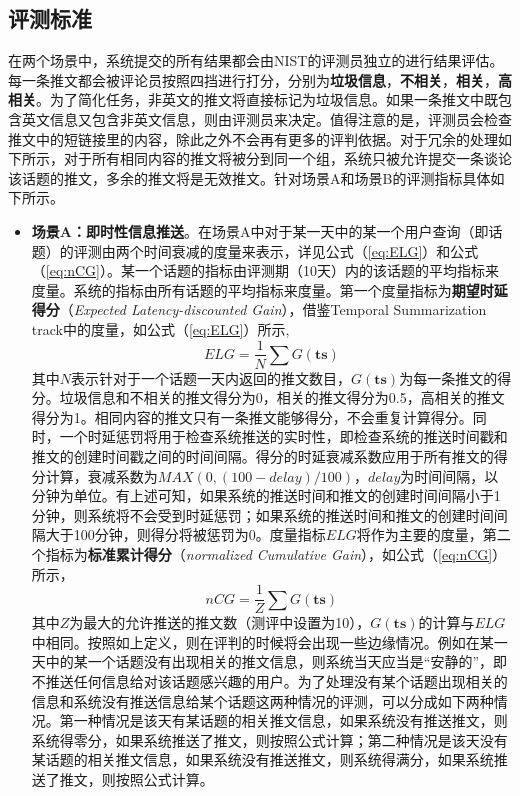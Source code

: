 \subsection{评测标准}
\label{subsec2:evalMetrics}
在两个场景中，系统提交的所有结果都会由NIST的评测员独立的进行结果评估。每一条推文都会被评论员按照四挡进行打分，分别为\textbf{垃圾信息}，\textbf{不相关}，\textbf{相关}，\textbf{高相关}。为了简化任务，非英文的推文将直接标记为垃圾信息。如果一条推文中既包含英文信息又包含非英文信息，则由评测员来决定。值得注意的是，评测员会检查推文中的短链接里的内容，除此之外不会再有更多的评判依据。对于冗余的处理如下所示，对于所有相同内容的推文将被分到同一个组，系统只被允许提交一条谈论该话题的推文，多余的推文将是无效推文。针对场景A和场景B的评测指标具体如下所示。
\begin{itemize}
  \item \textbf{场景A：即时性信息推送}。在场景A中对于某一天中的某一个用户查询（即话题）的评测由两个时间衰减的度量来表示，详见公式（\ref{eq:ELG}）和公式（\ref{eq:nCG}）。某一个话题的指标由评测期（10天）内的该话题的平均指标来度量。系统的指标由所有话题的平均指标来度量。第一个度量指标为\textbf{期望时延得分}（\textit{Expected Latency-discounted Gain}），借鉴Temporal Summarization track中的度量，如公式（\ref{eq:ELG}）所示,
  \begin{equation}
  \label{eq:ELG}
    ELG = \frac{1}{N}\sum {G\left( {\mathbf{ts}} \right)}
  \end{equation}
  其中$N$表示针对于一个话题一天内返回的推文数目，$G\left( {\mathbf{ts}} \right)$为每一条推文的得分。垃圾信息和不相关的推文得分为0，相关的推文得分为0.5，高相关的推文得分为1。相同内容的推文只有一条推文能够得分，不会重复计算得分。同时，一个时延惩罚将用于检查系统推送的实时性，即检查系统的推送时间戳和推文的创建时间戳之间的时间间隔。得分的时延衰减系数应用于所有推文的得分计算，衰减系数为$MAX\left( {0,\left( {100 - delay} \right)/100} \right)$，$delay$为时间间隔，以分钟为单位。有上述可知，如果系统的推送时间和推文的创建时间间隔小于1分钟，则系统将不会受到时延惩罚；如果系统的推送时间和推文的创建时间间隔大于100分钟，则得分将被惩罚为0。度量指标$ELG$将作为主要的度量，第二个指标为\textbf{标准累计得分}（\textit{normalized Cumulative Gain}），如公式（\ref{eq:nCG}）所示，
  \begin{equation}
  \label{eq:nCG}
    nCG = \frac{1}{Z}\sum {G\left( {\mathbf{ts}} \right)}
  \end{equation}
  其中$Z$为最大的允许推送的推文数（测评中设置为10），$G\left( {\mathbf{ts}} \right)$的计算与$ELG$中相同。按照如上定义，则在评判的时候将会出现一些边缘情况。例如在某一天中的某一个话题没有出现相关的推文信息，则系统当天应当是“安静的”，即不推送任何信息给对该话题感兴趣的用户。为了处理没有某个话题出现相关的信息和系统没有推送信息给某个话题这两种情况的评测，可以分成如下两种情况。第一种情况是该天有某话题的相关推文信息，如果系统没有推送推文，则系统得零分，如果系统推送了推文，则按照公式计算；第二种情况是该天没有某话题的相关推文信息，如果系统没有推送推文，则系统得满分，如果系统推送了推文，则按照公式计算。

\end{itemize}

